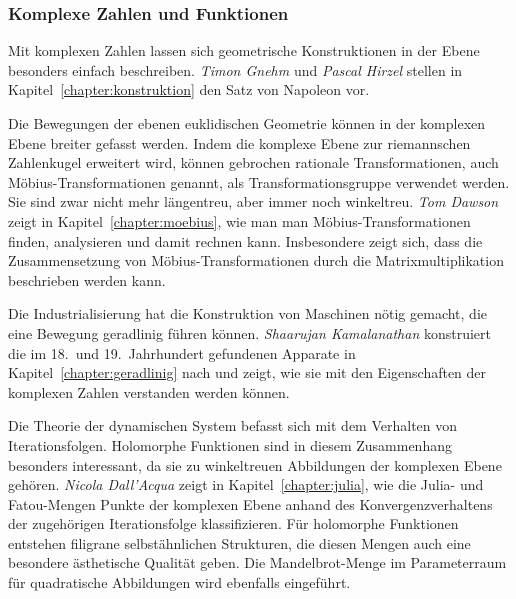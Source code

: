 %
%
\subsubsection{Komplexe Zahlen und Funktionen}

%
%
Mit komplexen Zahlen lassen sich geometrische Konstruktionen in
%
der Ebene besonders einfach beschreiben.
\emph{Timon Gnehm}
%
%
und
\emph{Pascal Hirzel}
%
%
stellen in Kapitel~\ref{chapter:konstruktion} den Satz von Napoleon
%
vor.

%
%
Die Bewegungen der ebenen euklidischen Geometrie können in der 
komplexen Ebene breiter gefasst werden.
Indem die komplexe Ebene zur riemannschen Zahlenkugel erweitert wird,
%
können gebrochen rationale Transformationen, auch Möbius-Transformationen
%
genannt, als Transformationsgruppe verwendet werden.
Sie sind zwar nicht mehr längentreu, aber immer noch winkeltreu.
\emph{Tom Dawson}
%
%
zeigt in Kapitel~\ref{chapter:moebius}, wie man man Möbius-Transformationen
finden, analysieren und damit rechnen kann.
Insbesondere zeigt sich, dass die Zusammensetzung von Möbius-Transformationen
durch die Matrixmultiplikation beschrieben werden kann.

%
%
Die Industrialisierung hat die Konstruktion von Maschinen nötig
gemacht, die eine Bewegung geradlinig führen können.
\emph{Shaarujan Kamalanathan}
%
%
konstruiert die im 18.~und 19.~Jahrhundert gefundenen Apparate
in Kapitel~\ref{chapter:geradlinig} nach und zeigt, wie sie mit den
Eigenschaften der komplexen Zahlen verstanden werden können.

%
%
Die Theorie der dynamischen System befasst sich mit dem Verhalten
von Iterationsfolgen.
Holomorphe Funktionen sind in diesem Zusammenhang besonders interessant,
da sie zu winkeltreuen Abbildungen der komplexen Ebene gehören.
\emph{Nicola Dall'Acqua} zeigt in Kapitel~\ref{chapter:julia}, wie
%
%
die Julia- und Fatou-Mengen Punkte der komplexen Ebene anhand des
%
%
Konvergenzverhaltens der zugehörigen Iterationsfolge klassifizieren.
Für holomorphe Funktionen entstehen filigrane selbstähnlichen Strukturen,
die diesen Mengen auch eine besondere ästhetische Qualität geben.
Die Mandelbrot-Menge im Parameterraum für quadratische Abbildungen
%
wird ebenfalls eingeführt.

